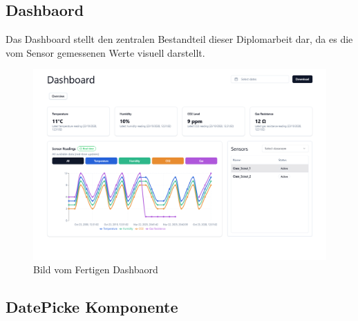 \begin{inhalt}
\begin{enumerate}[label=\textbf{\arabic*.}]
\clearpage

\section{Dashbaord}

Das Dashboard stellt den zentralen Bestandteil dieser Diplomarbeit dar, da es die vom Sensor gemessenen Werte visuell darstellt.


\begin{figure}[!htb]
\centering
\includegraphics[width=1\textwidth]{files/Thomas/pics/Website/dashbord/dashbaord-screen.png}
\vspace{-1.5cm}
\caption[Bild vom fertigen Dashbaord]{Bild vom Fertigen Dashbaord}
\label{fig:gehaeuse_internet_bild}
\end{figure}

\vspace{-0.75cm}

\subsection{DatePicke Komponente}


\end{enumerate}
\end{inhalt}
